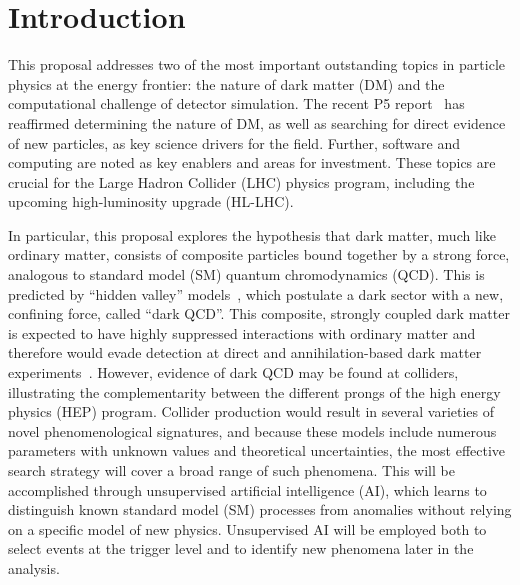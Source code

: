 \section{Introduction}\label{sec:intro}

This proposal addresses two of the most important outstanding topics in particle physics at the energy frontier:
the nature of dark matter (DM) and the computational challenge of detector simulation.
The recent P5 report~\cite{P5:2023} has reaffirmed determining the nature of DM,
as well as searching for direct evidence of new particles, as key science drivers for the field.
Further, software and computing are noted as key enablers and areas for investment.
These topics are crucial for the Large Hadron Collider (LHC) physics program,
including the upcoming high-luminosity upgrade (HL-LHC).

In particular, this proposal explores the hypothesis that dark matter, much like ordinary matter,
consists of composite particles bound together by a strong force, analogous to standard model (SM) quantum chromodynamics (QCD).
This is predicted by ``hidden valley'' models~\cite{Strassler:2006im}, which postulate a dark sector with a new, confining force, called ``dark QCD''.
This composite, strongly coupled dark matter is expected to have highly suppressed interactions with ordinary matter
and therefore would evade detection at direct and annihilation-based dark matter experiments~\cite{Cohen:2017pzm,Petraki:2013wwa}.
However, evidence of dark QCD may be found at colliders, illustrating the complementarity between the different prongs of the high energy physics (HEP) program.
Collider production would result in several varieties of novel phenomenological signatures,
and because these models include numerous parameters with unknown values and theoretical uncertainties, the most effective search strategy will cover a broad range of such phenomena.
This will be accomplished through unsupervised artificial intelligence (AI), which learns to distinguish known standard model (SM) processes from anomalies
without relying on a specific model of new physics.
Unsupervised AI will be employed both to select events at the trigger level and to identify new phenomena later in the analysis.

